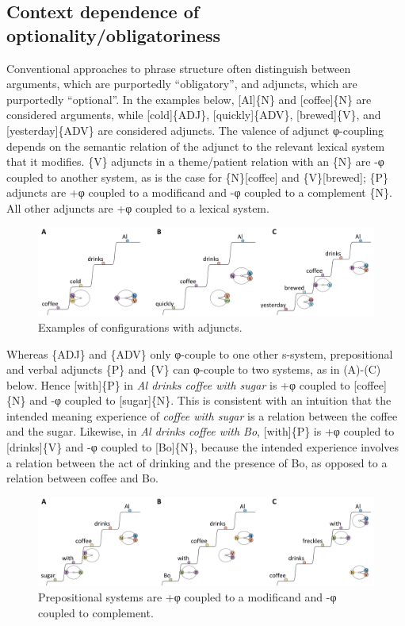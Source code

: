 \subsection{Context dependence of optionality/obligatoriness}

Conventional approaches to phrase structure often distinguish between arguments, which are purportedly “obligatory”, and adjuncts, which are purportedly “optional”. In the examples below, [Al]\{N\} and [coffee]\{N\} are considered arguments, while [cold]\{ADJ\}, [quickly]\{ADV\}, [brewed]\{V\}, and [yesterday]\{ADV\} are considered adjuncts. The valence of adjunct φ-coupling depends on the semantic relation of the adjunct to the relevant lexical system that it modifies. \{V\} adjuncts in a theme/patient relation with an \{N\} are -φ coupled to another system, as is the case for \{N\}[coffee] and \{V\}[brewed]; \{P\} adjuncts are +φ coupled to a modificand and -φ coupled to a complement \{N\}. All other adjuncts are +φ coupled to a lexical system.

  
\begin{figure}
\includegraphics[width=\textwidth]{figures/Tilsen-img83.png}
\caption{Examples of configurations with adjuncts.}
\label{fig:4:33}
\end{figure}
 

  Whereas \{ADJ\} and \{ADV\} only φ-couple to one other s-system, prepositional and verbal adjuncts \{P\} and \{V\} can φ-couple to two systems, as in (A)-(C) below. Hence [with]\{P\} in \textit{Al drinks coffee with sugar} is +φ coupled to [coffee]\{N\} and -φ coupled to [sugar]\{N\}. This is consistent with an intuition that the intended meaning experience of \textit{coffee with sugar} is a relation between the coffee and the sugar. Likewise, in \textit{Al drinks coffee with Bo}, [with]\{P\} is +φ coupled to [drinks]\{V\} and -φ coupled to [Bo]\{N\}, because the intended experience involves a relation between the act of drinking and the presence of Bo, as opposed to a relation between coffee and Bo.

  
\begin{figure}
\includegraphics[width=\textwidth]{figures/Tilsen-img84.png}
\caption{Prepositional systems are +φ coupled to a modificand and -φ coupled to complement.}
\label{fig:4:34}
\end{figure}
 

